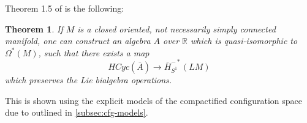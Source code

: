 \documentclass{scrartcl}
\theoremstyle{plain}
\newtheorem{theorem}{Theorem}[section]
\theoremstyle{definition}
\newcommand{\R}{\mathbb R}
\newcommand{\defeq}{\coloneqq}
\DeclareMathOperator{\Conf}{Conf}
\begin{document}
Theorem 1.5 of \cite{naef2019string} is the following: 
\begin{theorem}
    If $M$ is a closed oriented, not necessarily simply connected manifold, one can construct an algebra $A$ over $\R$ which is quasi-isomorphic to $\Omega^*(M)$, such that there exists a map 
    \begin{equation}HCyc(\bar A) \to \bar H^{-*}_{S^1}(LM)\end{equation}
    which preserves the Lie bialgebra operations.
\end{theorem}
This is shown using the explicit models of the compactified configuration space due to \cite{campos2016model} outlined in \cref{subsec:cfg-models}. 








\end{document}
